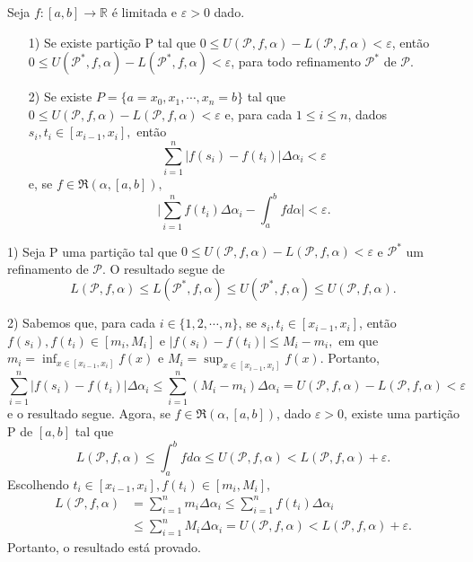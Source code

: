 \documentclass[Analysis/analysis_notes.tex]{subfiles}
\begin{document}
\begin{theorem*}
  Seja \(f:[a, b]\rightarrow \mathbb{R}\) é limitada e \(\varepsilon  > 0\) dado.
 \begin{itemize}
   \item[1)] Se existe parti\c cão P tal que \(0\leq U(\mathcal{P}, f, \alpha ) - L(\mathcal{P}, f, \alpha )  < \varepsilon \), então
     \(0\leq U(\mathcal{P}^{*}, f, \alpha ) - L(\mathcal{P}^{*}, f, \alpha ) < \varepsilon \), para todo refinamento \(\mathcal{P}^{*}\) de \(\mathcal{P}.\)
   \item[2)] Se existe \(P = \{a = x_{0}, x_{1}, \cdots, x_{n} = b\}\) tal que \(0\leq U(\mathcal{P}, f, \alpha ) - L(\mathcal{P}, f, \alpha ) < \varepsilon \) e, para
     cada \(1\leq i\leq n\), dados \(s_{i}, t_{i}\in [x_{i-1}, x_{i}], \) então 
       \[
         \sum\limits_{i=1}^{n}|f(s_{i}) - f(t_{i})|\Delta \alpha_{i} < \varepsilon  
       \]
       e, se \(f\in \mathfrak{R}(\alpha , [a, b]),\) 
         \[
           \biggl|\sum\limits_{i=1}^{n}f(t_{i})\Delta \alpha_{i} - \int_{a}^{b}f d\alpha\biggr| < \varepsilon . 
         \]
 \end{itemize}
\end{theorem*}
\begin{proof*}
  1) Seja P uma parti\c cão tal que \(0\leq U(\mathcal{P}, f, \alpha ) - L(\mathcal{P}, f, \alpha ) < \varepsilon \) e 
 \(\mathcal{P}^{*}\) um refinamento de \(\mathcal{P}.\) O resultado segue de 
   \[
     L(\mathcal{P}, f, \alpha )\leq L(\mathcal{P}^{*}, f, \alpha )\leq U(\mathcal{P}^{*}, f, \alpha )\leq U(\mathcal{P}, f, \alpha ).
   \]

  2) Sabemos que, para cada \(i\in\{1, 2, \cdots, n\}\), se \(s_{i}, t_{i}\in [x_{i-1}, x_{i}]\), então
  \(f(s_{i}), f(t_{i})\in[m_{i}, M_{i}]\) e \(|f(s_{i})-f(t_{i})|\leq M_{i} - m_{i},\) em que 
  \(m_{i} = \inf_{x\in[x_{i-1}, x_{i}]}f(x)\) e \(M_{i}=\sup_{x\in[x_{i-1}, x_{i}]}f(x)\). Portanto, 
    \[
      \sum\limits_{i=1}^{n}|f(s_{i})-f(t_{i})|\Delta \alpha_{i}\leq \sum\limits_{i=1}^{n}(M_{i}-m_{i})\Delta \alpha_{i} = U(\mathcal{P}, f, \alpha )-L(\mathcal{P}, f, \alpha ) <\varepsilon 
    \]
    e o resultado segue. Agora, se \(f\in \mathfrak{R}(\alpha , [a, b])\), dado \(\varepsilon >0\), existe uma 
    parti\c cão P de \([a, b]\) tal que 
      \[
        L(\mathcal{P}, f, \alpha )\leq \int_{a}^{b}f d\alpha \leq U(\mathcal{P}, f, \alpha ) < L(\mathcal{P}, f, \alpha ) + \varepsilon .
      \]
      Escolhendo \(t_{i}\in[x_{i-1}, x_{i}], f(t_{i})\in[m_{i}, M_{i}],\) 
     \begin{align*}
       L(\mathcal{P}, f, \alpha ) &= \sum\limits_{i=1}^{n}m_{i}\Delta \alpha_{i}\leq \sum\limits_{i=1}^{n}f(t_{i})\Delta \alpha_{i}\\
                                  &\leq \sum\limits_{i=1}^{n}M_{i}\Delta\alpha_{i} = U(\mathcal{P}, f, \alpha ) < L(\mathcal{P}, f, \alpha ) + \varepsilon. 
     \end{align*}
     Portanto, o resultado está provado. \qedsymbol
\end{proof*}
\end{document}
